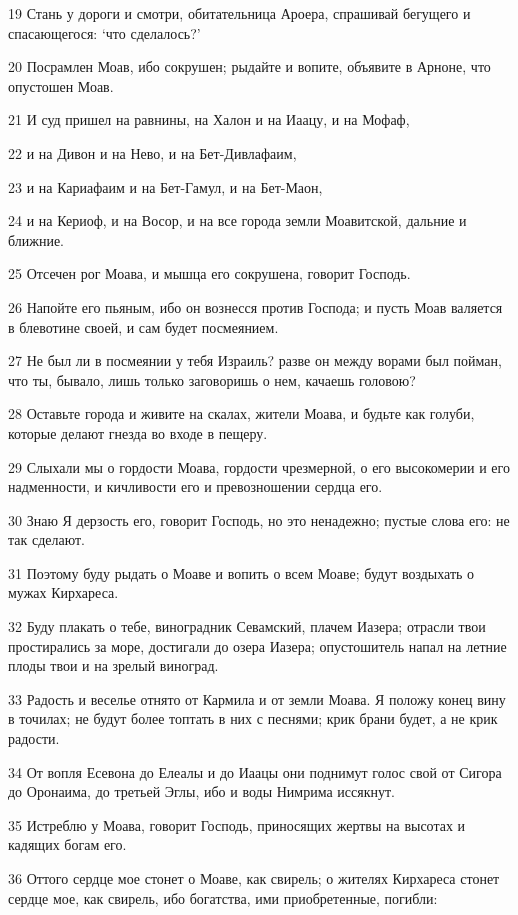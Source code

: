 \par 19 Стань у дороги и смотри, обитательница Ароера, спрашивай бегущего и спасающегося: `что сделалось?'
\par 20 Посрамлен Моав, ибо сокрушен; рыдайте и вопите, объявите в Арноне, что опустошен Моав.
\par 21 И суд пришел на равнины, на Халон и на Иаацу, и на Мофаф,
\par 22 и на Дивон и на Нево, и на Бет-Дивлафаим,
\par 23 и на Кариафаим и на Бет-Гамул, и на Бет-Маон,
\par 24 и на Кериоф, и на Восор, и на все города земли Моавитской, дальние и ближние.
\par 25 Отсечен рог Моава, и мышца его сокрушена, говорит Господь.
\par 26 Напойте его пьяным, ибо он вознесся против Господа; и пусть Моав валяется в блевотине своей, и сам будет посмеянием.
\par 27 Не был ли в посмеянии у тебя Израиль? разве он между ворами был пойман, что ты, бывало, лишь только заговоришь о нем, качаешь головою?
\par 28 Оставьте города и живите на скалах, жители Моава, и будьте как голуби, которые делают гнезда во входе в пещеру.
\par 29 Слыхали мы о гордости Моава, гордости чрезмерной, о его высокомерии и его надменности, и кичливости его и превозношении сердца его.
\par 30 Знаю Я дерзость его, говорит Господь, но это ненадежно; пустые слова его: не так сделают.
\par 31 Поэтому буду рыдать о Моаве и вопить о всем Моаве; будут воздыхать о мужах Кирхареса.
\par 32 Буду плакать о тебе, виноградник Севамский, плачем Иазера; отрасли твои простирались за море, достигали до озера Иазера; опустошитель напал на летние плоды твои и на зрелый виноград.
\par 33 Радость и веселье отнято от Кармила и от земли Моава. Я положу конец вину в точилах; не будут более топтать в них с песнями; крик брани будет, а не крик радости.
\par 34 От вопля Есевона до Елеалы и до Иаацы они поднимут голос свой от Сигора до Оронаима, до третьей Эглы, ибо и воды Нимрима иссякнут.
\par 35 Истреблю у Моава, говорит Господь, приносящих жертвы на высотах и кадящих богам его.
\par 36 Оттого сердце мое стонет о Моаве, как свирель; о жителях Кирхареса стонет сердце мое, как свирель, ибо богатства, ими приобретенные, погибли:
